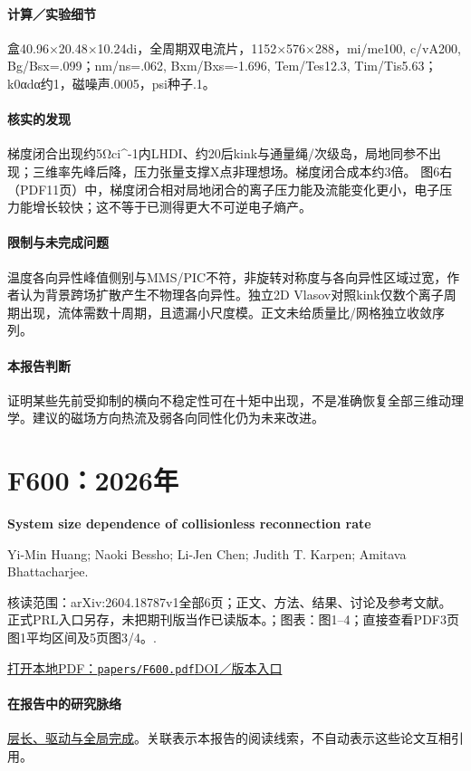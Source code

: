 \documentclass[UTF8,a4paper,11pt,openany,fontset=fandol]{ctexbook}
\begin{document}
\paragraph{计算／实验细节}盒40.96×20.48×10.24di，全周期双电流片，1152×576×288，mi/me100, c/vA200, Bg/Bsx=.099；nm/ns=.062, Bxm/Bxs=-1.696, Tem/Tes12.3, Tim/Tis5.63；k0αdα约1，磁噪声.0005，psi种子.1。

\paragraph{核实的发现}梯度闭合出现约5Ωci\textasciicircum{}-1内LHDI、约20后kink与通量绳/次级岛，局地同参不出现；三维率先峰后降，压力张量支撑X点非理想场。梯度闭合成本约3倍。 图6右（PDF11页）中，梯度闭合相对局地闭合的离子压力能及流能变化更小，电子压力能增长较快；这不等于已测得更大不可逆电子熵产。

\paragraph{限制与未完成问题}温度各向异性峰值侧别与MMS/PIC不符，非旋转对称度与各向异性区域过宽，作者认为背景跨场扩散产生不物理各向异性。独立2D Vlasov对照kink仅数个离子周期出现，流体需数十周期，且遗漏小尺度模。正文未给质量比/网格独立收敛序列。

\paragraph{本报告判断}证明某些先前受抑制的横向不稳定性可在十矩中出现，不是准确恢复全部三维动理学。建议的磁场方向热流及弱各向同性化仍为未来改进。

\section{F600：2026年}\label{paper:F600}

\textbf{System size dependence of collisionless reconnection rate}\citep{F600}\

Yi-Min Huang;  Naoki Bessho;  Li-Jen Chen;  Judith T. Karpen;  Amitava Bhattacharjee.

\textsf{核读范围：}arXiv:2604.18787v1全部6页；正文、方法、结果、讨论及参考文献。正式PRL入口另存，未把期刊版当作已读版本。；\textsf{图表：}图1–4；直接查看PDF3页图1平均区间及5页图3/4。.

\href{run:../papers/F600.pdf}{打开本地PDF：\texttt{papers/F600.pdf}}\quad\href{https://doi.org/10.1103/xpsr-4hqn}{DOI／版本入口}

\paragraph{在报告中的研究脉络}\hyperref[story:global]{层长、驱动与全局完成}。关联表示本报告的阅读线索，不自动表示这些论文互相引用。
\end{document}
